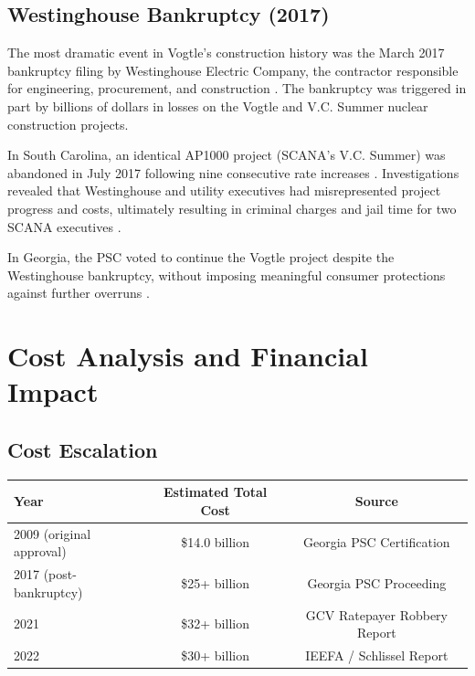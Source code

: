 \documentclass[12pt,a4paper]{article}
\begin{document}
\subsection{Westinghouse Bankruptcy (2017)}

The most dramatic event in Vogtle's construction history was the March 2017
bankruptcy filing by Westinghouse Electric Company, the contractor responsible for
engineering, procurement, and construction \cite{durand_truth,gcv_ratepayer}. The bankruptcy was triggered in part by
billions of dollars in losses on the Vogtle and V.C. Summer nuclear construction projects.

In South Carolina, an identical AP1000 project (SCANA's V.C. Summer) was abandoned
in July 2017 following nine consecutive rate increases \cite{durand_truth}. Investigations revealed that
Westinghouse and utility executives had misrepresented project progress and costs,
ultimately resulting in criminal charges and jail time for two SCANA executives \cite{durand_truth}.

In Georgia, the PSC voted to continue the Vogtle project despite the Westinghouse
bankruptcy, without imposing meaningful consumer protections against further overruns \cite{gcv_ratepayer,durand_truth}.

\section{Cost Analysis and Financial Impact}

\subsection{Cost Escalation}

\begin{center}
\begin{tabular}{lcc}
\toprule
\textbf{Year} & \textbf{Estimated Total Cost} & \textbf{Source} \\
\midrule
2009 (original approval) & \$14.0 billion & Georgia PSC Certification \\
2017 (post-bankruptcy) & \$25+ billion & Georgia PSC Proceeding \\
2021 & \$32+ billion & GCV Ratepayer Robbery Report \\
2022 & \$30+ billion & IEEFA / Schlissel Report \\
\bottomrule
\end{tabular}
\end{center}
\end{document}
